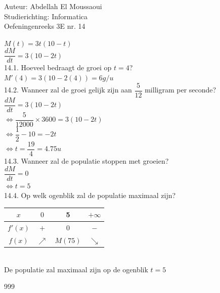 \documentclass[a4paper]{article}
\begin{document}
  
\noindent \large Auteur: Abdellah El Moussaoui \\
\noindent \large Studierichting: Informatica\\
\noindent \large Oefeningenreeks 3E nr. 14\\

\medskip

\normalsize

$M\left(t\right) = 3t\left(10-t\right)$\\

$\dfrac{dM}{dt} = 3\left(10 - 2t\right)$ \\

14.1. Hoeveel bedraagt de groei op $t = 4$? \\

$M'\left(4\right) = 3\left(10 - 2\left(4\right)\right) = \boxed{6g/u}$\\

14.2. Wanneer zal de groei gelijk zijn aan $\dfrac{5}{12}$ milligram per seconde?\\

$\dfrac{dM}{dt} = 3\left(10 - 2t\right)$ \\

$\Leftrightarrow\dfrac{5}{12000} \times3600 = 3\left(10 - 2t\right)$ \\

$\Leftrightarrow \dfrac{1}{2} - 10 = -2t$ \\

$\Leftrightarrow \boxed{t = \dfrac{19}{4} = 4.75u}$ \\

14.3. Wanneer zal de populatie stoppen met groeien?\\

$\dfrac{dM}{dt} = 0$\\

$\Leftrightarrow \boxed{t = 5}$ \\

14.4. Op welk ogenblik zal de populatie maximaal zijn?\\

\begin{tabular}{c|ccc}
        $x$     & $0$ &  5  & $+\infty$\\ 
        \hline
        $f'(x)$ & $+$ &  $0$  & $-$ \\ 
        \hline
        $f(x)$  & $\nearrow$  & $M(75)$   & $\searrow$ \\
\end{tabular}\\

De populatie zal maximaal zijn op de ogenblik $t = 5$\\


\begin{thebibliography}{999}
\end{thebibliography}
\end{document}

